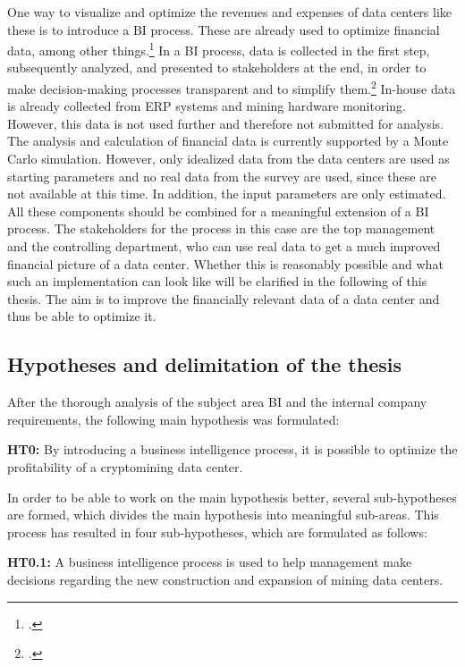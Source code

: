 One way to visualize and optimize the revenues and expenses of data centers like these is to introduce a 
\ac{BI} process. These are already used to optimize financial data, among other things.\footcite[Cf.][pp. 105]{azma2012business} 
In a \ac{BI} process, data is collected in the first step, subsequently analyzed, and presented to stakeholders at the end,
in order to make decision-making processes transparent and to simplify them.\footcite[Cf.][pp. 1]{loshin2012business} 
In-house data is already collected from \ac{ERP} systems and mining hardware monitoring. 
However, this data is not used further and therefore not submitted for analysis. The analysis and calculation of financial data is
currently supported by a Monte Carlo simulation. However, only idealized data from the data centers are used as starting parameters and 
no real data from the survey are used, since these are not available at this time. In addition, the input parameters are
only estimated. All these components should be combined for a meaningful extension of a \ac{BI} process. The stakeholders for
the process in this case are the top management and the controlling department, who can use
real data to get a much improved financial picture of a data center. Whether this is reasonably possible 
and what such an implementation can look like will be clarified in the following of this thesis. The aim is to improve the financially relevant data of a 
data center and thus be able to optimize it. 

\subsection{Hypotheses and delimitation of the thesis} \label{toc:hypothesenundabgrenzungderarbeit}

After the thorough analysis of the subject area \ac{BI} and the internal company requirements, the following main hypothesis was 
formulated: 

\textbf{\ac{HT0}: }By introducing a business intelligence process, it is possible to optimize the profitability of a cryptomining
data center. 

In order to be able to work on the main hypothesis better, several sub-hypotheses are formed, which divides the main hypothesis into
meaningful sub-areas. This process has resulted in four sub-hypotheses, which are formulated as follows: 

\textbf{\ac{HT0.1}: }A business intelligence process is used to help management make decisions regarding the
new construction and expansion of mining data centers. 

